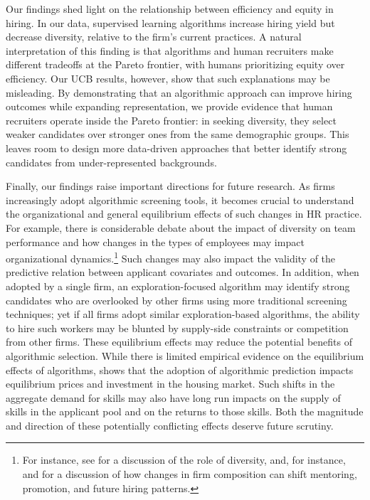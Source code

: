 \documentclass[crop,noquery,editorname,historyrev,nosurname,runningno,sepcount]{RESTUD}
\begin{document}
Our findings shed light on the relationship between efficiency and equity in hiring.  In our data, supervised learning algorithms increase hiring yield but decrease diversity, relative to the firm's current practices.  A natural interpretation of this finding is that algorithms and human recruiters make different tradeoffs at the Pareto frontier, with humans prioritizing equity over efficiency.  Our UCB results, however, show that such explanations may be misleading. By demonstrating that an algorithmic approach can improve hiring outcomes while expanding representation, we provide evidence that human recruiters operate inside the Pareto frontier: in seeking diversity, they select weaker candidates over stronger ones from the same demographic groups. This leaves room to design more data-driven approaches that better identify strong candidates from under-represented backgrounds.
 

Finally, our findings raise important directions for future research. 
As firms increasingly adopt algorithmic screening tools, it becomes crucial to understand the organizational and general equilibrium effects of such changes in HR practice.  For example, there is considerable debate about the impact of diversity on team performance and how changes in the types of employees may impact organizational dynamics.\footnote{For instance, see \citet{reagans2001} for a discussion of the role of diversity, and, for instance, \citet{atheymentoring} and \citet{fernandez} for a discussion of how changes in firm composition can shift  mentoring, promotion, and future hiring patterns.}  Such changes may also impact the validity of the predictive relation between applicant covariates and outcomes.  In addition, when adopted by a single firm, an exploration-focused algorithm may identify strong candidates who are overlooked by other firms using more traditional screening techniques; yet if all firms adopt similar exploration-based algorithms, the ability to hire such workers may be blunted by supply-side constraints or competition from other firms. These equilibrium effects may reduce the potential benefits of algorithmic selection. While there is limited empirical evidence on the equilibrium effects of algorithms, \citet{raymondjmp} shows that the adoption of algorithmic prediction impacts equilibrium prices and investment in the housing market. Such shifts in the aggregate demand for skills may also have long run impacts on the supply of skills in the applicant pool and on the returns to those skills. Both the magnitude and direction of these potentially conflicting effects deserve future scrutiny.  
\end{document}
